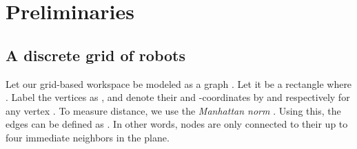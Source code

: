 \section{Preliminaries}
%
%
%



\subsection{A discrete grid of robots}

Let our grid-based workspace be modeled as a graph . Let it be a rectangle  where . Label the vertices as , and denote their  and  -coordinates by  and  respectively for any vertex . To measure distance, we use the \emph{Manhattan norm} . Using this, the edges can be defined as . In other words, nodes are only connected to their up to four immediate neighbors in the plane.

